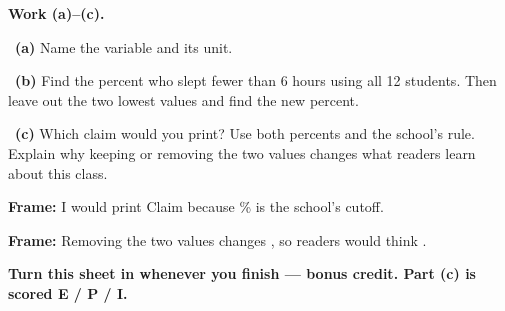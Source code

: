 \documentclass[11pt]{article}
\begin{document}
\newpage
\textbf{Work (a)--(c).}\par\smallskip

~\textbf{(a)} Name the variable and its unit.\par
\workspace{0.7in}

~\textbf{(b)} Find the percent who slept fewer than 6 hours using all 12 students. Then leave out the two lowest values and find the new percent.\par
\workspace{1.4in}

~\textbf{(c)} Which claim would you print? Use both percents and the school's rule. Explain why keeping or removing the two values changes what readers learn about this class.\par
\workspace{2.0in}

\begin{sentenceframebox}\raggedright\textbf{Frame:} I would print Claim \blank[0.4in] because \blank[0.6in]\% is \blank[0.8in] the school's cutoff.\end{sentenceframebox}

\begin{sentenceframebox}\raggedright\textbf{Frame:} Removing the two values changes \blank[1.7in], so readers would think \blank[2in].\end{sentenceframebox}

\textbf{Turn this sheet in whenever you finish --- bonus credit. Part (c) is scored E / P / I.}\par
\end{document}
